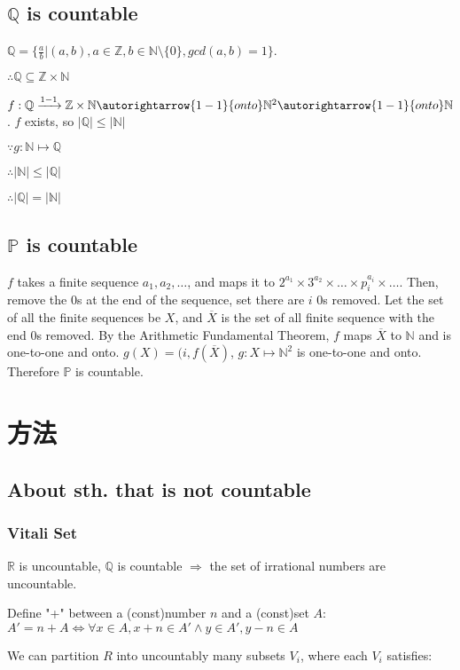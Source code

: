 \documentclass[12pt,a4paper]{ctexrep}
\begin{document}
\subsection{$\mathbb{Q}$ is countable} 
$\mathbb{Q} = \{\frac{a}{b}|(a,b),a \in \mathbb{Z},b\in \mathbb{N}\setminus\{0\},gcd(a,b) = 1\}$. 

$\therefore \mathbb{Q} \subseteq \mathbb{Z}\times \mathbb{N}$

$f: \mathbb{Q}\xrightarrow{1-1}\mathbb{Z}\times\mathbb{N}\autorightarrow{1-1}{onto}\mathbb{N}^2\autorightarrow{1-1}{onto}\mathbb{N}$. $f$ exists, so $|\mathbb{Q}|\leqslant|\mathbb{N}|$

$\because g:\mathbb{N}\mapsto \mathbb{Q}$

$\therefore |\mathbb{N}|\leqslant|\mathbb{Q}|$

$\therefore |\mathbb{Q}| = |\mathbb{N}|$
\subsection{$\mathbb{P}$ is countable}
$f$ takes a finite sequence $a_1,a_2,\dots$, and maps it to $2^{a_1}\times3^{a_2}\times\dots\times p_i^{a_i} \times\dots$. Then, remove the 0s at the end of the sequence, set there are $i$ 0s removed. Let the set of all the finite sequences be $X$, and $\overline{X}$ is the set of all finite sequence with the end 0s removed. By the Arithmetic Fundamental Theorem, $f$ maps $\overline{X}$ to $\mathbb{N}$ and is one-to-one and onto. $g(X) = (i,f(\overline{X})$, $g:X \mapsto \mathbb{N}^2$ is one-to-one and onto. Therefore $\mathbb{P}$ is countable.


\section{方法}
\subsection{About sth. that is not countable}
\subsubsection{Vitali Set}
$\mathbb{R}$ is uncountable, $\mathbb{Q}$ is countable $\Rightarrow$ the set of irrational numbers are uncountable.

Define "+" between a (const)number $n$ and a (const)set $A$: $A' = n+A \iff \forall x\in A, x+n \in A' \wedge y \in A', y-n \in A$

We can partition $R$ into uncountably many subsets $V_i$, where each $V_i$ satisfies:
\end{document}
